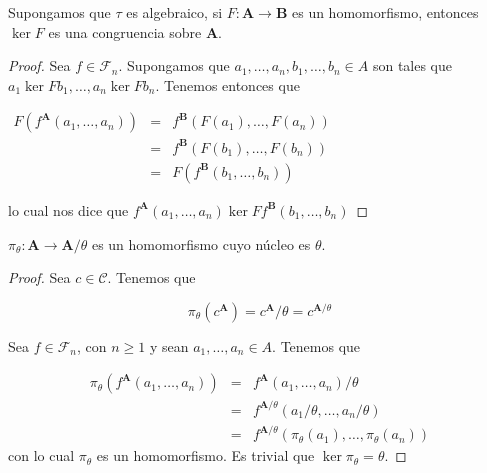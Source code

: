  \begin{lemma} \label{lemma_52}
    \PN Supongamos que $\tau$ es algebraico, si $F: \mathbf{A} \rightarrow \mathbf{B}$ es un homomorfismo, entonces
    $\ker F$ es una congruencia sobre $\mathbf{A}$.
  \end{lemma}
  \begin{proof}
    Sea $f\in \mathcal{F}_{n}$. Supongamos que $a_{1}, \dotsc, a_{n},b_{1}, \dotsc, b_{n} \in A$ son tales que $a_{1}\ker Fb_{1}, \dotsc, a_{n}\ker Fb_{n}$. Tenemos entonces que

    $\displaystyle \begin{array}{ccl} F(f^{\mathbf{A}}(a_{1}, \dotsc, a_{n})) & = & f^{\mathbf{B} }(F(a_{1}), \dotsc, F(a_{n})) \\ & = & f^{\mathbf{B}}(F(b_{1}), \dotsc, F(b_{n})) \\ & = & F(f^{\mathbf{B}}(b_{1}, \dotsc, b_{n})) \end{array} $

    lo cual nos dice que $f^{\mathbf{A}}(a_{1}, \dotsc, a_{n})\ker Ff^{\mathbf{B} }(b_{1}, \dotsc, b_{n})$
  \end{proof}

  \begin{lemma} \label{lemma_53}
    \PN $\pi_{\theta}: \mathbf{A} \rightarrow \mathbf{A}/\theta$ es un homomorfismo cuyo núcleo es $\theta$.
  \end{lemma}
  \begin{proof}
    Sea $c\in \mathcal{C}$. Tenemos que

    \[
      \pi_{\theta}(c^{\mathbf{A}}) = c^{\mathbf{A}}/\theta = c^{\mathbf{A}/\theta}
    \]

    Sea $f\in \mathcal{F}_{n}$, con $n\geq 1$ y sean $a_{1}, \dotsc, a_{n}\in A$. Tenemos que

    \[
      \begin{array}{ccl}
        \pi_{\theta}(f^{\mathbf{A}}(a_{1}, \dotsc, a_{n})) &=& f^{\mathbf{A}}(a_{1}, \dotsc, a_{n})/\theta \\
        &=& f^{\mathbf{A}/\theta}(a_{1}/\theta, \dotsc, a_{n}/\theta) \\
        &=& f^{\mathbf{A}/\theta}(\pi_{\theta}(a_{1}), \dotsc, \pi_{\theta}(a_{n}))
      \end{array}
    \]
    con lo cual $\pi _{\theta }$ es un homomorfismo. Es trivial que $\ker \pi _{\theta }=\theta $.
  \end{proof}

